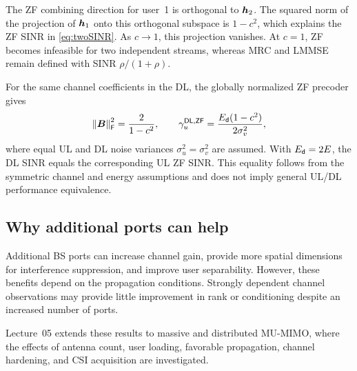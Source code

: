 The ZF combining direction for user~1 is orthogonal to $\bm{h}_2$. The squared norm of the projection of $\bm{h}_1$ onto this orthogonal subspace is $1-c^2$, which explains the ZF SINR in \eqref{eq:twoSINR}. As $c\to1$, this projection vanishes. At $c=1$, ZF becomes infeasible for two independent streams, whereas MRC and LMMSE remain defined with SINR $\rho/(1+\rho)$.

For the same channel coefficients in the DL, the globally normalized ZF precoder gives
\begin{equation}
	\left\|\bm{B}\right\|_{\mathsf{F}}^2=\frac{2}{1-c^2},
	\qquad
	\gamma_u^{\mathsf{DL},\mathsf{ZF}}
	=\frac{E_{\mathsf{d}}(1-c^2)}{2\sigma_v^2},
\end{equation}
where equal UL and DL noise variances $\sigma_u^2=\sigma_v^2$ are assumed. With $E_{\mathsf{d}}=2E$, the DL SINR equals the corresponding UL ZF SINR. This equality follows from the symmetric channel and energy assumptions and does not imply general UL/DL performance equivalence.

\subsection{Why additional ports can help}
Additional BS ports can increase channel gain, provide more spatial dimensions for interference suppression, and improve user separability. However, these benefits depend on the propagation conditions. Strongly dependent channel observations may provide little improvement in rank or conditioning despite an increased number of ports.

Lecture~05 extends these results to massive and distributed MU-MIMO, where the effects of antenna count, user loading, favorable propagation, channel hardening, and CSI acquisition are investigated.



